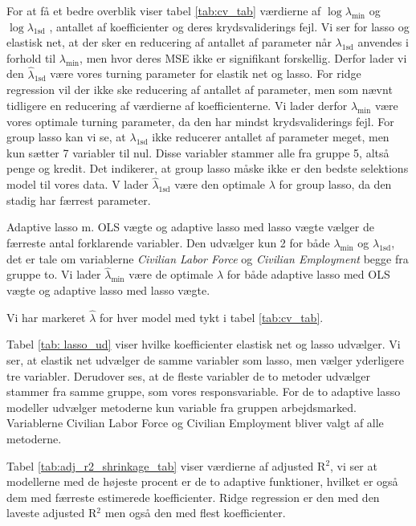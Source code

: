 For at få et bedre overblik viser tabel  \ref{tab:cv_tab} værdierne af $\log \lambda_{\min}$ og $\log \lambda_{1\text{sd}}$ , antallet af koefficienter og deres krydsvaliderings fejl.  
Vi ser for lasso og elastisk net, at der sker en reducering af antallet af parameter når $\lambda_{1\text{sd}}$ anvendes i forhold til $\lambda_{\min}$, men hvor deres MSE ikke er signifikant forskellig.  
Derfor lader vi den $\widehat{\lambda}_{1\text{sd}}$ være vores turning parameter for elastik net og lasso. 
For ridge regression vil der ikke ske reducering af antallet af parameter, men som nævnt tidligere en reducering af værdierne af koefficienterne. 
Vi lader derfor $\widehat{\lambda}_{\min}$ være vores optimale turning parameter, da den har mindst krydsvaliderings fejl.
%
For group lasso kan vi se, at  $\lambda_{1\text{sd}}$ ikke reducerer antallet af parameter meget, men kun sætter 7 variabler til nul. 
Disse variabler stammer alle fra gruppe 5, altså penge og kredit. 
Det indikerer, at group lasso måske ikke er den bedste selektions model til vores data. 
V lader $\widehat{\lambda}_{1\text{sd}}$ være den optimale $\lambda$ for group lasso, da den stadig har færrest parameter. 

Adaptive lasso m. OLS vægte og adaptive lasso med lasso vægte vælger de færreste antal forklarende variabler. 
Den udvælger kun 2 for både  $\lambda_{\min}$ og $\lambda_{1\text{sd}}$, det er tale om variablerne \textit{Civilian Labor Force} og \textit{Civilian Employment} begge fra gruppe to. 
Vi lader  $\widehat{\lambda}_{\min}$ være de optimale  $\lambda$ for både adaptive lasso med OLS vægte og adaptive lasso med lasso vægte. 

Vi har markeret $\widehat{\lambda}$ for hver model med tykt i tabel  \ref{tab:cv_tab}. 

Tabel \ref{tab: lasso_ud} viser hvilke koefficienter elastisk net og lasso udvælger. 
Vi ser, at elastik net udvælger de samme variabler som lasso, men vælger yderligere tre variabler. 
Derudover ses, at de fleste variabler de to metoder udvælger stammer fra samme gruppe, som vores responsvariable.  
For de to adaptive lasso modeller udvælger metoderne kun variable fra gruppen arbejdsmarked. 
Variablerne Civilian Labor Force og Civilian Employment bliver valgt af alle metoderne. 


Tabel  \ref{tab:adj_r2_shrinkage_tab} viser værdierne af adjusted R$^2$, vi ser at modellerne med de højeste procent er de to adaptive funktioner, hvilket er også dem med færreste estimerede koefficienter. Ridge regression er den med den laveste adjusted R$^2$ men også den med flest koefficienter. 


